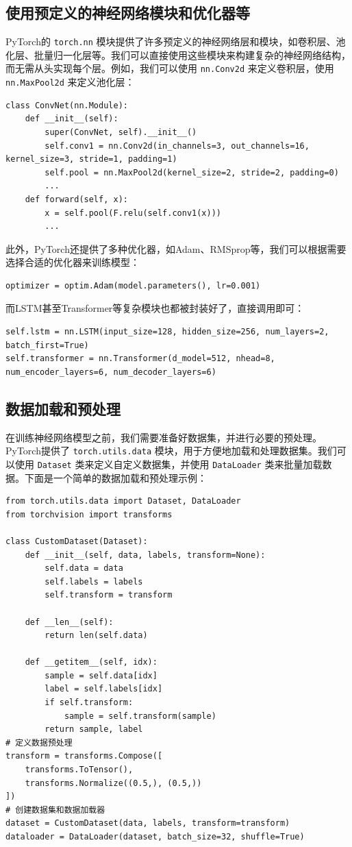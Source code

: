 \subsection{使用预定义的神经网络模块和优化器等}
PyTorch的 \verb|torch.nn| 模块提供了许多预定义的神经网络层和模块，如卷积层、池化层、批量归一化层等。我们可以直接使用这些模块来构建复杂的神经网络结构，而无需从头实现每个层。例如，我们可以使用 \verb|nn.Conv2d| 来定义卷积层，使用 \verb|nn.MaxPool2d| 来定义池化层：
\begin{verbatim}
class ConvNet(nn.Module):
    def __init__(self):
        super(ConvNet, self).__init__()
        self.conv1 = nn.Conv2d(in_channels=3, out_channels=16, kernel_size=3, stride=1, padding=1)
        self.pool = nn.MaxPool2d(kernel_size=2, stride=2, padding=0)
        ...
    def forward(self, x):
        x = self.pool(F.relu(self.conv1(x)))
        ...
\end{verbatim}
此外，PyTorch还提供了多种优化器，如Adam、RMSprop等，我们可以根据需要选择合适的优化器来训练模型：
\begin{verbatim}
optimizer = optim.Adam(model.parameters(), lr=0.001)
\end{verbatim}

而LSTM甚至Transformer等复杂模块也都被封装好了，直接调用即可：
\begin{verbatim}
self.lstm = nn.LSTM(input_size=128, hidden_size=256, num_layers=2, batch_first=True)
self.transformer = nn.Transformer(d_model=512, nhead=8, num_encoder_layers=6, num_decoder_layers=6)
\end{verbatim}

\subsection{数据加载和预处理}

在训练神经网络模型之前，我们需要准备好数据集，并进行必要的预处理。PyTorch提供了 \verb|torch.utils.data| 模块，用于方便地加载和处理数据集。我们可以使用 \verb|Dataset| 类来定义自定义数据集，并使用 \verb|DataLoader| 类来批量加载数据。下面是一个简单的数据加载和预处理示例：
\begin{verbatim}
from torch.utils.data import Dataset, DataLoader
from torchvision import transforms

class CustomDataset(Dataset):
    def __init__(self, data, labels, transform=None):
        self.data = data
        self.labels = labels
        self.transform = transform

    def __len__(self):
        return len(self.data)

    def __getitem__(self, idx):
        sample = self.data[idx]
        label = self.labels[idx]
        if self.transform:
            sample = self.transform(sample)
        return sample, label
# 定义数据预处理
transform = transforms.Compose([
    transforms.ToTensor(),
    transforms.Normalize((0.5,), (0.5,))
])
# 创建数据集和数据加载器
dataset = CustomDataset(data, labels, transform=transform)
dataloader = DataLoader(dataset, batch_size=32, shuffle=True)
\end{verbatim}

